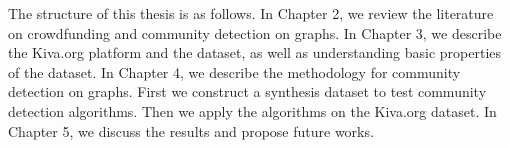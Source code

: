 The structure of this thesis is as follows.
In Chapter 2, we review the literature on crowdfunding and community detection on graphs.
In Chapter 3, we describe the Kiva.org platform and the dataset,
as well as understanding basic properties of the dataset.
In Chapter 4, we describe the methodology for community detection on graphs.
First we construct a synthesis dataset to test community detection algorithms.
Then we apply the algorithms on the Kiva.org dataset.
In Chapter 5, we discuss the results and propose future works.
